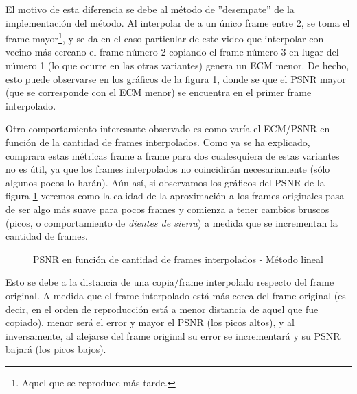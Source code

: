 \par El motivo de esta diferencia se debe al m\'etodo de ''desempate'' de la
implementaci\'on del m\'etodo. Al interpolar de a un \'unico frame entre 2,
se toma el frame mayor\footnote{Aquel que se reproduce m\'as tarde.}, y se
da en el caso particular de este video que interpolar con vecino m\'as cercano
el frame n\'umero 2 copiando el frame n\'umero 3 en lugar del n\'umero 1 (lo
que ocurre en las otras variantes) genera un ECM menor. De hecho, esto puede
observarse en los gr\'aficos de la figura \ref{fig:movil-fija_vecino-frames},
donde se que el PSNR mayor (que se corresponde con el ECM menor) se encuentra
en el primer frame interpolado.

\par Otro comportamiento interesante observado es como var\'ia el ECM/PSNR
en funci\'on de la cantidad de frames interpolados. Como ya se ha explicado,
comprara estas m\'etricas frame a frame para dos cualesquiera de estas variantes
no es \'util, ya que los frames interpolados no coincidir\'an necesariamente
(s\'olo algunos pocos lo har\'an). A\'un as\'i, si observamos los gr\'aficos
del PSNR de la figura \ref{fig:movil-fija_vecino-frames} veremos como la calidad
de la aproximaci\'on a los frames originales pasa de ser algo m\'as suave para
pocos frames y comienza a tener cambios bruscos (picos, o comportamiento de
\emph{dientes de sierra}) a medida que se incrementan la cantidad de frames.

\begin{figure}[H]
    \centering
    \caption{PSNR en funci\'on de cantidad de frames interpolados - M\'etodo lineal}
    \label{fig:movil-fija_vecino-frames}
\end{figure}

\par Esto se debe a la distancia de una copia/frame interpolado respecto del
frame original. A medida que el frame interpolado est\'a m\'as cerca del frame
original (es decir, en el orden de reproducci\'on est\'a a menor distancia de
aquel que fue copiado), menor ser\'a el error y mayor el PSNR (los picos altos),
y al inversamente, al alejarse del frame original su error se incrementar\'a
y su PSNR bajar\'a (los picos bajos).

